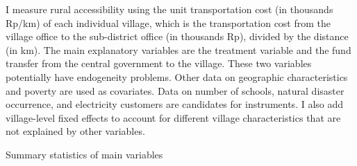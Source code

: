 \documentclass[letterpaper,11pt,leqno]{article}
\newcommand{\bib}{bibliography.bib}
\begin{document}
I measure rural accessibility using the unit transportation cost (in thousands Rp/km) of each individual village, which is the transportation cost from the village office to the sub-district office (in thousands Rp), divided by the distance (in km). The main explanatory variables are the treatment variable and the fund transfer from the central government to the village. These two variables potentially have endogeneity problems.  Other  data on geographic characteristics and poverty are used as covariates. Data on number of schools, natural disaster occurrence, and electricity customers are candidates for instruments. I also add village-level fixed effects to account for different village characteristics that are not explained by other variables.

\begin{landscape}
\begin{table}[t]
\caption{Summary statistics of main variables}

\label{t1}\end{table}

\end{landscape}
\end{document}
